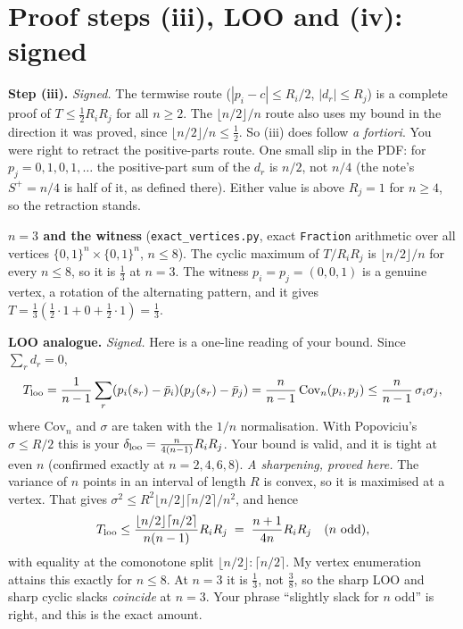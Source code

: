 \documentclass[11pt]{article}
\begin{document}
\section{Proof steps (iii), LOO and (iv): signed}\label{sec:proof}
\textbf{Step (iii).} \emph{Signed.} The termwise route ($|p_i-c|\le R_i/2$, $|d_r|\le R_j$) is a complete proof of $T\le\frac12R_iR_j$ for all $n\ge2$. The $\lfloor n/2\rfloor/n$ route also uses my bound in the direction it was proved, since $\lfloor n/2\rfloor/n\le\frac12$. So (iii) does follow \emph{a fortiori}.
You were right to retract the positive-parts route. One small slip in the PDF: for $p_j=0,1,0,1,\dots$ the positive-part sum of the $d_r$ is $n/2$, not $n/4$ (the note's $S^+=n/4$ is half of it, as defined there). Either value is above $R_j=1$ for $n\ge4$, so the retraction stands.

\textbf{$n=3$ and the witness} (\texttt{exact\_vertices.py}, exact \texttt{Fraction} arithmetic over all vertices $\{0,1\}^n\times\{0,1\}^n$, $n\le8$). The cyclic maximum of $T/R_iR_j$ is $\lfloor n/2\rfloor/n$ for every $n\le8$, so it is $\frac13$ at $n=3$. The witness $p_i=p_j=(0,0,1)$ is a genuine vertex, a rotation of the alternating pattern, and it gives $T=\frac13(\frac12\cdot1+0+\frac12\cdot1)=\frac13$.

\textbf{LOO analogue.} \emph{Signed.} Here is a one-line reading of your bound. Since $\sum_r d_r=0$,
\[
T_{\rm loo}=\frac{1}{n-1}\sum_r(p_i(s_r)-\bar p_i)(p_j(s_r)-\bar p_j)=\frac{n}{n-1}\,\mathrm{Cov}_n(p_i,p_j)\le\frac{n}{n-1}\,\sigma_i\sigma_j ,
\]
where $\mathrm{Cov}_n$ and $\sigma$ are taken with the $1/n$ normalisation.
With Popoviciu's $\sigma\le R/2$ this is your $\delta_{\rm loo}=\frac{n}{4(n-1)}R_iR_j$. Your bound is valid, and it is tight at even $n$ (confirmed exactly at $n=2,4,6,8$).
\emph{A sharpening, proved here.} The variance of $n$ points in an interval of length $R$ is convex, so it is maximised at a vertex. That gives $\sigma^2\le R^2\lfloor n/2\rfloor\lceil n/2\rceil/n^2$, and hence
\[
T_{\rm loo}\le\frac{\lfloor n/2\rfloor\lceil n/2\rceil}{n(n-1)}R_iR_j\;=\;\frac{n+1}{4n}R_iR_j\quad(n\text{ odd}),
\]
with equality at the comonotone split $\lfloor n/2\rfloor{:}\lceil n/2\rceil$. My vertex enumeration attains this exactly for $n\le8$. At $n=3$ it is $\frac13$, not $\frac38$, so the sharp LOO and sharp cyclic slacks \emph{coincide} at $n=3$.
Your phrase ``slightly slack for $n$ odd'' is right, and this is the exact amount.
\end{document}

